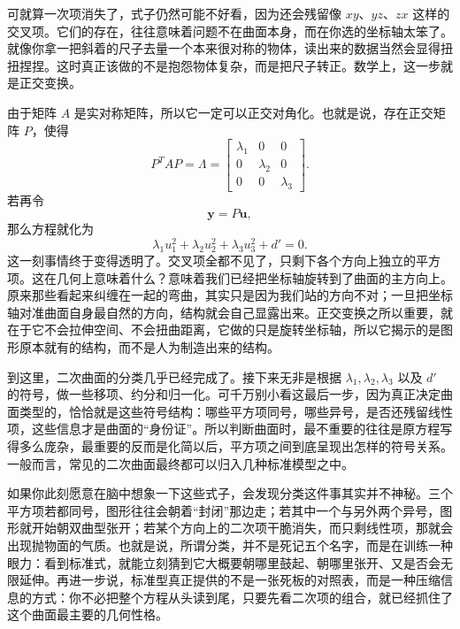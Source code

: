 \documentclass[UTF8]{ctexbook}
\begin{document}
可就算一次项消失了，式子仍然可能不好看，因为还会残留像 $xy$、$yz$、$zx$ 这样的交叉项。它们的存在，往往意味着问题不在曲面本身，而在你选的坐标轴太笨了。就像你拿一把斜着的尺子去量一个本来很对称的物体，读出来的数据当然会显得扭扭捏捏。这时真正该做的不是抱怨物体复杂，而是把尺子转正。数学上，这一步就是正交变换。

由于矩阵 $A$ 是实对称矩阵，所以它一定可以正交对角化。也就是说，存在正交矩阵 $P$，使得
\[
P^TAP=\Lambda=
\begin{bmatrix}
\lambda_1 & 0 & 0\\
0 & \lambda_2 & 0\\
0 & 0 & \lambda_3
\end{bmatrix}.
\]
若再令
\[
\mathbf{y}=P\mathbf{u},
\]
那么方程就化为
\[
\lambda_1u_1^2+\lambda_2u_2^2+\lambda_3u_3^2+d'=0.
\]
这一刻事情终于变得透明了。交叉项全都不见了，只剩下各个方向上独立的平方项。这在几何上意味着什么？意味着我们已经把坐标轴旋转到了曲面的主方向上。原来那些看起来纠缠在一起的弯曲，其实只是因为我们站的方向不对；一旦把坐标轴对准曲面自身最自然的方向，结构就会自己显露出来。正交变换之所以重要，就在于它不会拉伸空间、不会扭曲距离，它做的只是旋转坐标轴，所以它揭示的是图形原本就有的结构，而不是人为制造出来的结构。

到这里，二次曲面的分类几乎已经完成了。接下来无非是根据 $\lambda_1,\lambda_2,\lambda_3$ 以及 $d'$ 的符号，做一些移项、约分和归一化。可千万别小看这最后一步，因为真正决定曲面类型的，恰恰就是这些符号结构：哪些平方项同号，哪些异号，是否还残留线性项，这些信息才是曲面的“身份证”。所以判断曲面时，最不重要的往往是原方程写得多么庞杂，最重要的反而是化简以后，平方项之间到底呈现出怎样的符号关系。一般而言，常见的二次曲面最终都可以归入几种标准模型之中。


如果你此刻愿意在脑中想象一下这些式子，会发现分类这件事其实并不神秘。三个平方项若都同号，图形往往会朝着“封闭”那边走；若其中一个与另外两个异号，图形就开始朝双曲型张开；若某个方向上的二次项干脆消失，而只剩线性项，那就会出现抛物面的气质。也就是说，所谓分类，并不是死记五个名字，而是在训练一种眼力：看到标准式，就能立刻猜到它大概要朝哪里鼓起、朝哪里张开、又是否会无限延伸。再进一步说，标准型真正提供的不是一张死板的对照表，而是一种压缩信息的方式：你不必把整个方程从头读到尾，只要先看二次项的组合，就已经抓住了这个曲面最主要的几何性格。\label{2times}
\end{document}
